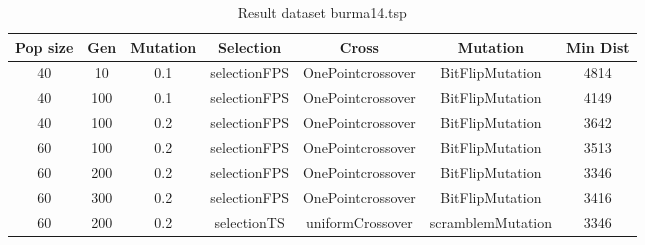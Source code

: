\documentclass[12pt]{report}
\begin{document}
    \begin{table}
        \centering
        \begin{tabular}{|c|c|c|c|c|c|c|}
            \hline
            Pop size & Gen & Mutation & Selection & Cross & Mutation & Min Dist\\
            \hline
            40 & 10 & 0.1 & selectionFPS & OnePointcrossover & BitFlipMutation & 4814 \\
            \hline
            40 & 100 & 0.1 & selectionFPS & OnePointcrossover & BitFlipMutation & 4149 \\
            \hline
            40 & 100 & 0.2 & selectionFPS & OnePointcrossover & BitFlipMutation & 3642 \\
            \hline
            60 & 100 & 0.2 & selectionFPS & OnePointcrossover & BitFlipMutation & 3513 \\
            \hline
            60 & 200 & 0.2 & selectionFPS & OnePointcrossover & BitFlipMutation & 3346 \\
            \hline
            60 & 300 & 0.2 & selectionFPS & OnePointcrossover & BitFlipMutation & 3416 \\
            \hline
            60 & 200 & 0.2 & selectionTS & uniformCrossover & scramblemMutation & 3346 \\
            \hline
            \end{tabular}
        \caption{Result dataset burma14.tsp}
        \label{resultsBurma14}
    \end{table}
\end{document}
